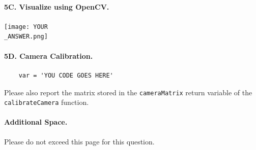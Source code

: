 \newpage
\paragraph{5C. Visualize using OpenCV.}
\begin{center}
    \texttt{[image: YOUR\\\_ANSWER.png]}
\end{center}

\paragraph{5D. Camera Calibration.}
%
\begin{verbatim}
    var = 'YOU CODE GOES HERE'
\end{verbatim}

Please also report the matrix stored in the \texttt{cameraMatrix} return variable of the \texttt{calibrateCamera} function.


\newpage
\paragraph{Additional Space.}
Please do not exceed this page for this question.

